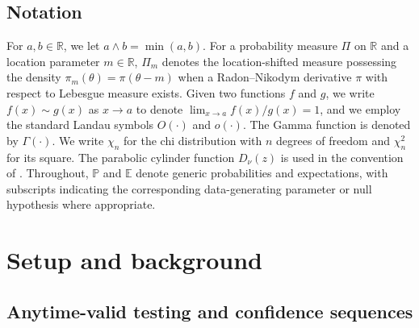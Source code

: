 \documentclass[numsec,webpdf,modern,medium,namedate]{oup-authoring-template}
\theoremstyle{thmstyleone}%
\theoremstyle{thmstyletwo}%
\theoremstyle{thmstylethree}%
\newcommand{\1}{\mathbf{1}}
\begin{document}
\subsection{Notation}


For $a, b \in \mathbb{R}$, we let $a \wedge b = \min(a,b)$. For a probability measure $\Pi$ on $\mathbb{R}$ and a location parameter $m \in \mathbb{R}$, $\Pi_m$ denotes the location-shifted measure possessing the density $\pi_m(\theta) = \pi(\theta - m)$ when a Radon--Nikodym derivative $\pi$ with respect to Lebesgue measure exists. Given two functions $f$ and $g$, we write $f(x) \sim g(x)$ as $x \to a$ to denote $\lim_{x \to a} f(x)/g(x) = 1$, and we employ the standard Landau symbols $O(\cdot)$ and $o(\cdot)$. The Gamma function is denoted by $\Gamma(\cdot)$. We write $\chi_n$ for the chi distribution with $n$ degrees of freedom and $\chi_n^2$ for its square. The parabolic cylinder function $D_{\nu}(z)$ is used in the convention of \cite{GradshteynRyzhik2014}. Throughout, $\mathbb{P}$ and $\mathbb{E}$ denote generic probabilities and expectations, with subscripts indicating the corresponding data-generating parameter or null hypothesis where appropriate.



\section{Setup and background}\label{sec:setup}
\subsection{Anytime-valid testing and confidence sequences}\label{ssec:avtesting}
\end{document}
